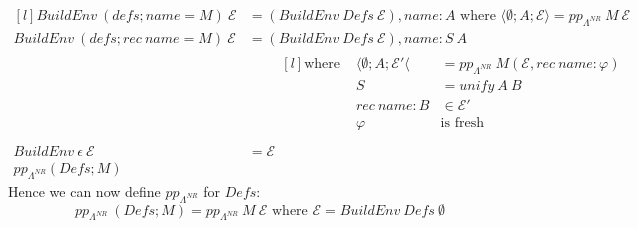 \[\begin{matrix*}[l]
    BuildEnv \ (defs; name = M) \ \mathcal{E} & = (BuildEnv \ Defs \ \mathcal{E}), name: A \text{ where } \langle \emptyset ; A ; \mathcal{E} \rangle = pp_{\Lambda^{NR}} \ M \ \mathcal{E} \\
    BuildEnv \ (defs; rec \ name = M) \ \mathcal{E} & = (BuildEnv \ Defs \ \mathcal{E}), name : S \ A \\
    & \qquad \begin{matrix*}[l]
        \text{where } & \langle \emptyset ; A ; \mathcal{E}' \langle & = pp_{\Lambda^{NR}} \ M (\mathcal{E}, rec \ name: \varphi) \\
        & S &= unify \ A \ B \\
        & rec \ name: B & \in \mathcal{E}' \\
        & \varphi & \text{is fresh} \\
    \end{matrix*} \\
    BuildEnv \ \epsilon \ \mathcal{E} & = \mathcal{E} \\
    pp_{\Lambda^{NR}} (Defs ; M)
\end{matrix*}\]
Hence we can now define $pp_{\Lambda^{NR}}$ for $Defs$:
\[pp_{\Lambda^{NR}} \ (Defs; M) = pp_{\Lambda^{NR}} \ M \ \mathcal{E} \text{ where } \mathcal{E} = BuildEnv \ Defs \ \emptyset\]
